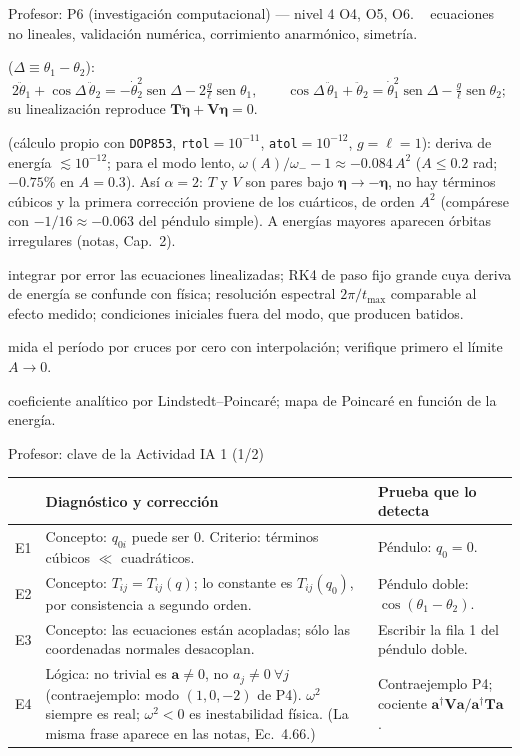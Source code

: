 \documentclass[spanish]{beamer}
\newcommand{\Tm}{\mathbf{T}}              %
\newcommand{\Vm}{\mathbf{V}}              %
\newcommand{\bfeta}{\boldsymbol{\eta}}    %
\newcommand{\ba}{\boldsymbol{a}}          %
\begin{document}
\begin{frame}{Profesor: P6 (investigación computacional) --- nivel 4}
\scriptsize
{} O4, O5, O6. \  ecuaciones no lineales, validación numérica, corrimiento anarmónico, simetría.

 ($\Delta\equiv\theta_1-\theta_2$):
\[
2\ddot\theta_1+\cos\Delta\,\ddot\theta_2=-\dot\theta_2^2\operatorname{sen}\Delta-2\tfrac{g}{\ell}\operatorname{sen}\theta_1,\qquad
\cos\Delta\,\ddot\theta_1+\ddot\theta_2=\dot\theta_1^2\operatorname{sen}\Delta-\tfrac{g}{\ell}\operatorname{sen}\theta_2 ;
\]
su linealización reproduce $\Tm\ddot{\bfeta}+\Vm\bfeta=0$.

 (cálculo propio con \texttt{DOP853}, \texttt{rtol}$=10^{-11}$, \texttt{atol}$=10^{-12}$, $g=\ell=1$): deriva de energía $\lesssim10^{-12}$; para el modo lento, $\omega(A)/\omega_--1\approx-0.084\,A^2$ ($A\le0.2$ rad; $-0.75\%$ en $A=0.3$). Así $\alpha=2$: $T$ y $V$ son pares bajo $\bfeta\to-\bfeta$, no hay términos cúbicos y la primera corrección proviene de los cuárticos, de orden $A^2$ (compárese con $-1/16\approx-0.063$ del péndulo simple). A energías mayores aparecen órbitas irregulares (notas, Cap.~2).

 integrar por error las ecuaciones linealizadas; RK4 de paso fijo grande cuya deriva de energía se confunde con física; resolución espectral $2\pi/t_{\max}$ comparable al efecto medido; condiciones iniciales fuera del modo, que producen batidos.

 mida el período por cruces por cero con interpolación; verifique primero el límite $A\to0$.

 coeficiente analítico por Lindstedt--Poincaré; mapa de Poincaré en función de la energía.
\end{frame}

\begin{frame}{Profesor: clave de la Actividad IA 1 (1/2)}
\scriptsize
\begin{tabular}{@{}L{0.05\textwidth}L{0.54\textwidth}L{0.33\textwidth}@{}}
\toprule
& \textbf{Diagnóstico y corrección} & \textbf{Prueba que lo detecta}\\
\midrule
E1 & Concepto: $q_{0i}$ puede ser 0. Criterio: términos cúbicos $\ll$ cuadráticos. & Péndulo: $q_0=0$. \\
E2 & Concepto: $T_{ij}=T_{ij}(q)$; lo constante es $T_{ij}(q_0)$, por consistencia a segundo orden. & Péndulo doble: $\cos(\theta_1-\theta_2)$. \\
E3 & Concepto: las ecuaciones están acopladas; sólo las coordenadas normales desacoplan. & Escribir la fila 1 del péndulo doble. \\
E4 & Lógica: no trivial es $\ba\neq0$, no $a_j\neq0\ \forall j$ (contraejemplo: modo $(1,0,-2)$ de P4). $\omega^2$ siempre es real; $\omega^2<0$ es inestabilidad física. (La misma frase aparece en las notas, Ec.~4.66.) & Contraejemplo P4; cociente $\ba^\dagger\Vm\ba/\ba^\dagger\Tm\ba$. \\
\bottomrule
\end{tabular}
\end{frame}
\end{document}
